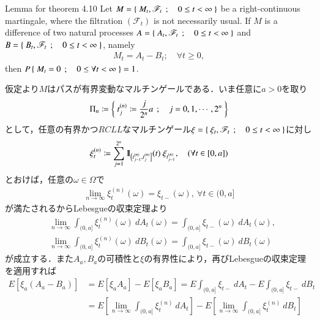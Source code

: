 	\begin{itembox}[l]{Lemma for theorem 4.10}\label{lem:uniqueness_of_Doob_Meyer_decomposition}
		Let $M = \left\{\ M_t,\mathscr{F}_t\ \, ; \quad 0 \leq t < \infty\ \right\}$ be a right-continuous martingale,
		where the filtration $(\mathscr{F}_t)$ is not necessarily usual.
		If $M$ is a difference of two natural processes 
		$A = \left\{\ A_t,\mathscr{F}_t\ \, ; \quad 0 \leq t < \infty\ \right\}$
		and $B = \left\{\ B_t,\mathscr{F}_t\ \, ; \quad 0 \leq t < \infty\ \right\}$, namely
		\begin{align}
			M_t = A_t - B_t; \quad \forall t \geq 0,
		\end{align}
		then $P\left\{\ M_t = 0\ \, ; \quad 0 \leq \forall t < \infty\ \right\} = 1$.
	\end{itembox}
	
	\begin{prf}
		仮定より$M$はパスが有界変動なマルチンゲールである．いま任意に$a > 0$を取り
		\begin{align}
			\Pi_n \coloneqq \left\{\ t^{(n)}_j \coloneqq \frac{j}{2^n}a\ \, ; \quad j=0,1,\cdots,2^n\ \right\}
		\end{align}
		として，任意の有界かつ$RCLL$なマルチンゲール$\xi = \left\{\ \xi_t,\mathscr{F}_t\ \, ; \quad 0 \leq t < \infty\ \right\}$に対し
		\begin{align}
			\xi^{(n)}_t \coloneqq \sum_{j=1}^{2^n} \mbox{1}\hspace{-0.25em}\mbox{l}_{\left(t_{j-1}^{(n)},t_j^{(n)}\right]}(t)\ \xi_{t^{(n)}_{j-1}},
			\quad (\forall t \in [0,a])
		\end{align}
		とおけば，任意の$\omega \in \Omega$で
		\begin{align}
			\lim_{n \to \infty} \xi^{(n)}_t(\omega) = \xi_{t-}(\omega),\ \forall t \in (0,a]
		\end{align}
		が満たされるからLebesgueの収束定理より
		\begin{align}
			&\lim_{n \to \infty} \int_{(0,a]} \xi^{(n)}_t(\omega)\ dA_t(\omega) = \int_{(0,a]} \xi_{t-}(\omega)\ dA_t(\omega), \\
			&\lim_{n \to \infty} \int_{(0,a]} \xi^{(n)}_t(\omega)\ dB_t(\omega) = \int_{(0,a]} \xi_{t-}(\omega)\ dB_t(\omega)
		\end{align}
		が成立する．また$A_a,B_a$の可積性と$\xi$の有界性により，再びLebesgueの収束定理を適用すれば
		\begin{align}
			E\left[ \xi_a\left( A_a - B_a \right) \right]
			&= E\left[ \xi_a A_a \right] -  E\left[ \xi_a B_a \right]
			= E \int_{(0,a]} \xi_{t-}\ dA_t - E\int_{(0,a]} \xi_{t-}\ dB_t \\
			&= E \left[ \lim_{n \to \infty} \int_{(0,a]} \xi^{(n)}_t\ dA_t \right]
				- E \left[ \lim_{n \to \infty} \int_{(0,a]} \xi^{(n)}_t\ dB_t \right] \\

\end{align}
\end{prf}
